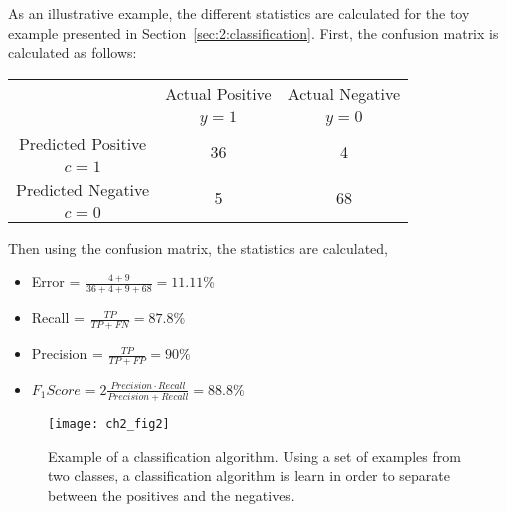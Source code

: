   As an illustrative example, the different statistics are calculated for the toy example presented 
  in Section~\ref{sec:2:classification}. First, the confusion matrix is calculated as 
  follows:
  \begin{center}
    \footnotesize
  \begin{tabular}{c|c|c}
    \multicolumn{1}{c|}{}  & Actual Positive& Actual Negative \\
    \multicolumn{1}{c|}{} & $y=1$& $y=0$ \\
    \hline
    Predicted Positive    & \multirow{ 2}{*}{36} & \multirow{ 
    2}{*}{4} \\
    $c=1$ & &\\
    \hline
    Predicted Negative    & \multirow{ 2}{*}{5} & \multirow{ 
    2}{*}{68} \\
    $c=0$ & &\\
  \end{tabular}
  \end{center}
  Then using the confusion matrix, the statistics are calculated,
 	\begin{itemize}
  	\item Error = $\frac{4+9}{36+4+9+68}=11.11\%$
		\item Recall = $\frac{TP}{TP+FN}=87.8\%$
		\item Precision = $\frac{TP}{TP+FP}=90\%$
		\item $F_1Score = 2\frac{Precision \cdot Recall}{Precision + Recall}=88.8\%$
	\end{itemize}
	
\begin{figure}[t!]
	\centering
	\texttt{[image: ch2\_fig2]}
	\caption{Example of a classification algorithm. Using a set of examples from two classes, a 
	classification algorithm is learn in order to separate between the positives and the negatives. }
	\label{fig:2:3}
\end{figure}

